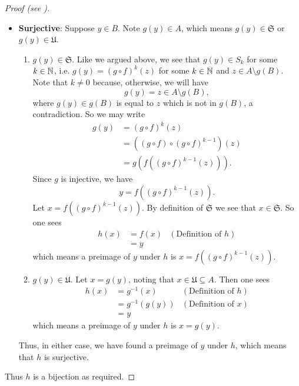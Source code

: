 \begin{proof}[Proof (see {\cite[Theorem 14.10, pp.~286--287]{hammack_2018}})]
\begin{itemize}
\begin{enumerate}
            \item $x_1 \in \mathfrak{U}$ and $x_2 \in \mathfrak{S}$. Similar argument as case 3 shows that this is not possible.
        \end{enumerate}
        Thus, in all (possible) cases, we have $x_1 = x_2$, meaning $h$ is injective.
        
        \item \textbf{Surjective}: Suppose $y \in B$. Note $g(y) \in A$, which means $g(y) \in \mathfrak{S}$ or $g(y) \in \mathfrak{U}$.
        \begin{enumerate}
            \item $g(y) \in \mathfrak{S}$. Like we argued above, we see that $g(y) \in S_k$ for some $k \in \mathbb{N}$, i.e. $g(y) = (g\circ f)^k(z)$ for some $k \in \mathbb{N}$ and $z \in A \setminus g(B)$. Note that $k \neq 0$ because, otherwise, we will have
            \[
                g(y) = z \in A \setminus g(B),
            \]
            where $g(y) \in g(B)$ is equal to $z$ which is not in $g(B)$, a contradiction. So we may write
            \begin{align*}
                g(y) &= (g\circ f)^k(z)\\
                &= ((g \circ f) \circ (g\circ f)^{k-1})(z)\\
                &= g(f((g\circ f)^{k-1}(z))).
            \end{align*}
            Since $g$ is injective, we have
            \[
                y = f((g\circ f)^{k-1}(z)).
            \]
            Let $x = f((g\circ f)^{k-1}(z))$. By definition of $\mathfrak{S}$ we see that $x \in \mathfrak{S}$. So one sees
            \begin{align*}
                h(x) &= f(x) & (\text{Definition of } h)\\
                &= y
            \end{align*}
            which means a preimage of $y$ under $h$ is $x = f((g\circ f)^{k-1}(z))$.
            
            \item $g(y) \in \mathfrak{U}$. Let $x = g(y)$, noting that $x \in \mathfrak{U} \subseteq A$. Then one sees
            \begin{align*}
                h(x) &= g^{-1}(x) & (\text{Definition of } h)\\
                &= g^{-1}(g(y)) & (\text{Definition of } x)\\
                &= y
            \end{align*}
            which means a preimage of $y$ under $h$ is $x = g(y)$.
        \end{enumerate}
        Thus, in either case, we have found a preimage of $y$ under $h$, which means that $h$ is surjective.
    \end{itemize}
    Thus $h$ is a bijection as required.
\end{proof}
